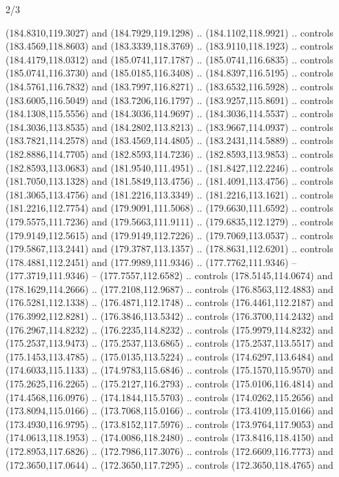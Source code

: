 \begin{flagdescription}{2/3}
\begin{scope}[xshift=0.5\flaglength,yshift=0.5\flagwidth,scale=\flagwidth/180]
\begin{scope}[y=0.8pt, x=0.8pt, yscale=-1,shift={(-168.75,-108.75)}]
  (184.8310,119.3027) and (184.7929,119.1298) .. (184.1102,118.9921) .. controls
  (183.4569,118.8603) and (183.3339,118.3769) .. (183.9110,118.1923) .. controls
  (184.4179,118.0312) and (185.0741,117.1787) .. (185.0741,116.6835) .. controls
  (185.0741,116.3730) and (185.0185,116.3408) .. (184.8397,116.5195) .. controls
  (184.5761,116.7832) and (183.7997,116.8271) .. (183.6532,116.5928) .. controls
  (183.6005,116.5049) and (183.7206,116.1797) .. (183.9257,115.8691) .. controls
  (184.1308,115.5556) and (184.3036,114.9697) .. (184.3036,114.5537) .. controls
  (184.3036,113.8535) and (184.2802,113.8213) .. (183.9667,114.0937) .. controls
  (183.7821,114.2578) and (183.4569,114.4805) .. (183.2431,114.5889) .. controls
  (182.8886,114.7705) and (182.8593,114.7236) .. (182.8593,113.9853) .. controls
  (182.8593,113.0683) and (181.9540,111.4951) .. (181.8427,112.2246) .. controls
  (181.7050,113.1328) and (181.5849,113.4756) .. (181.4091,113.4756) .. controls
  (181.3065,113.4756) and (181.2216,113.3349) .. (181.2216,113.1621) .. controls
  (181.2216,112.7754) and (179.9091,111.5068) .. (179.6630,111.6592) .. controls
  (179.5575,111.7236) and (179.5663,111.9111) .. (179.6835,112.1279) .. controls
  (179.9149,112.5615) and (179.9149,112.7226) .. (179.7069,113.0537) .. controls
  (179.5867,113.2441) and (179.3787,113.1357) .. (178.8631,112.6201) .. controls
  (178.4881,112.2451) and (177.9989,111.9346) .. (177.7762,111.9346) --
  (177.3719,111.9346) -- (177.7557,112.6582) .. controls (178.5145,114.0674) and
  (178.1629,114.2666) .. (177.2108,112.9687) .. controls (176.8563,112.4883) and
  (176.5281,112.1338) .. (176.4871,112.1748) .. controls (176.4461,112.2187) and
  (176.3992,112.8281) .. (176.3846,113.5342) .. controls (176.3700,114.2432) and
  (176.2967,114.8232) .. (176.2235,114.8232) .. controls (175.9979,114.8232) and
  (175.2537,113.9473) .. (175.2537,113.6865) .. controls (175.2537,113.5517) and
  (175.1453,113.4785) .. (175.0135,113.5224) .. controls (174.6297,113.6484) and
  (174.6033,115.1133) .. (174.9783,115.6846) .. controls (175.1570,115.9570) and
  (175.2625,116.2265) .. (175.2127,116.2793) .. controls (175.0106,116.4814) and
  (174.4568,116.0976) .. (174.1844,115.5703) .. controls (174.0262,115.2656) and
  (173.8094,115.0166) .. (173.7068,115.0166) .. controls (173.4109,115.0166) and
  (173.4930,116.9795) .. (173.8152,117.5976) .. controls (173.9764,117.9053) and
  (174.0613,118.1953) .. (174.0086,118.2480) .. controls (173.8416,118.4150) and
  (172.8953,117.6826) .. (172.7986,117.3076) .. controls (172.6609,116.7773) and
  (172.3650,117.0644) .. (172.3650,117.7295) .. controls (172.3650,118.4765) and

\end{scope}
\end{scope}
\end{flagdescription}
